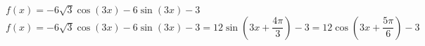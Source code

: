 {$f(x) = -6\sqrt{3} \cos(3x) - 6\sin(3x) - 3$}
{$f(x) = -6\sqrt{3} \cos(3x) - 6\sin(3x) - 3 = 12\sin\left(3x + \dfrac{4\pi}{3}\right) - 3 = 12\cos\left(3x + \dfrac{5\pi}{6}\right) - 3$}
